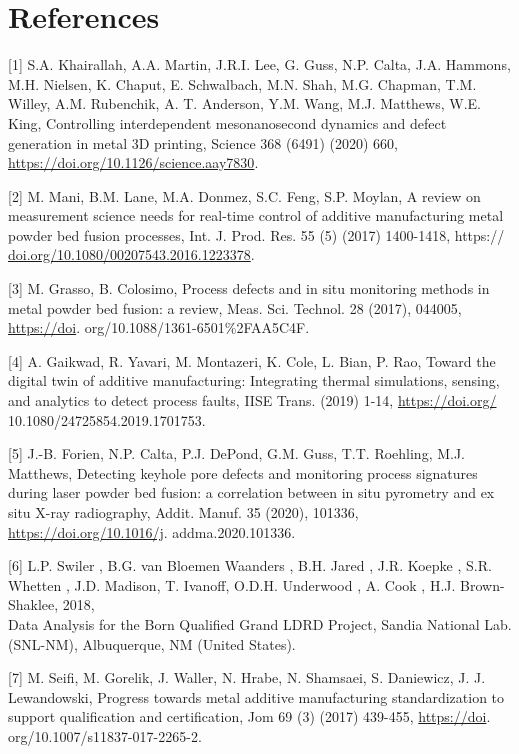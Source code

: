 \documentclass[10pt]{article}
\begin{document}
\section*{References}
[1] S.A. Khairallah, A.A. Martin, J.R.I. Lee, G. Guss, N.P. Calta, J.A. Hammons, M.H. Nielsen, K. Chaput, E. Schwalbach, M.N. Shah, M.G. Chapman, T.M. Willey, A.M. Rubenchik, A. T. Anderson, Y.M. Wang, M.J. Matthews, W.E. King, Controlling interdependent mesonanosecond dynamics and defect generation in metal 3D printing, Science 368 (6491) (2020) 660, \href{https://doi.org/10.1126/science.aay7830}{https://doi.org/10.1126/science.aay7830}.

[2] M. Mani, B.M. Lane, M.A. Donmez, S.C. Feng, S.P. Moylan, A review on measurement science needs for real-time control of additive manufacturing metal powder bed fusion processes, Int. J. Prod. Res. 55 (5) (2017) 1400-1418, https:// \href{http://doi.org/10.1080/00207543.2016.1223378}{doi.org/10.1080/00207543.2016.1223378}.

[3] M. Grasso, B. Colosimo, Process defects and in situ monitoring methods in metal powder bed fusion: a review, Meas. Sci. Technol. 28 (2017), 044005, \href{https://doi}{https://doi}. org/10.1088/1361-6501\%2FAA5C4F.

[4] A. Gaikwad, R. Yavari, M. Montazeri, K. Cole, L. Bian, P. Rao, Toward the digital twin of additive manufacturing: Integrating thermal simulations, sensing, and analytics to detect process faults, IISE Trans. (2019) 1-14, \href{https://doi.org/}{https://doi.org/} 10.1080/24725854.2019.1701753.

[5] J.-B. Forien, N.P. Calta, P.J. DePond, G.M. Guss, T.T. Roehling, M.J. Matthews, Detecting keyhole pore defects and monitoring process signatures during laser powder bed fusion: a correlation between in situ pyrometry and ex situ X-ray radiography, Addit. Manuf. 35 (2020), 101336, \href{https://doi.org/10.1016/j}{https://doi.org/10.1016/j}. addma.2020.101336.

[6] L.P. Swiler , B.G. van Bloemen Waanders , B.H. Jared , J.R. Koepke , S.R. Whetten , J.D. Madison, T. Ivanoff, O.D.H. Underwood , A. Cook , H.J. Brown-Shaklee, 2018,\\
Data Analysis for the Born Qualified Grand LDRD Project, Sandia National Lab. (SNL-NM), Albuquerque, NM (United States).

[7] M. Seifi, M. Gorelik, J. Waller, N. Hrabe, N. Shamsaei, S. Daniewicz, J. J. Lewandowski, Progress towards metal additive manufacturing standardization to support qualification and certification, Jom 69 (3) (2017) 439-455, \href{https://doi}{https://doi}. org/10.1007/s11837-017-2265-2.
\end{document}
